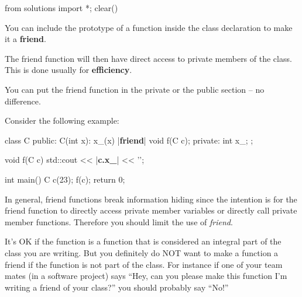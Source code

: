 \begin{python0}
from solutions import *; clear()
\end{python0}

You can include the prototype of a function inside the class declaration
to make it a \textbf{friend}.

The friend function will then have direct access to private members of
the class. This is done usually for \textbf{efficiency}.

You can put the friend function in the private or the public section --
no difference.

Consider the following example:

\begin{consolethree}[escapeinside=||]
class C
{
public:
    C(int x):
        x_(x)
    {}
    |{\bf friend}| void f(C c);
private:
    int x_;
};

void f(C c)
{
    std::cout << |{\bf c.x\_}| << '\n';
}

int main()
{
    C c(23);
    f(c);
    return 0;
}
\end{consolethree}


In general, friend functions break information hiding since the
intention is for the friend function to directly access private member
variables or directly call private member functions. Therefore you
should limit the use of \textit{friend}.

It's OK if the function is a function that is considered an integral
part of the class you are writing. But you definitely do NOT want to
make a function a friend if the function is not part of the class. For
instance if one of your team mates (in a software project) says ``Hey,
can you please make this function I'm writing a friend of your class?''
you should probably say ``No!''


